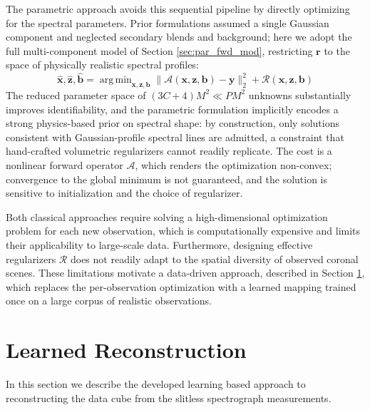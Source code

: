 \documentclass[linenumbers,twocolumn]{aastex7}
\DeclareMathOperator*{\argmin}{arg\,min}
\begin{document}
The parametric approach avoids this sequential pipeline by directly optimizing
for the spectral parameters. Prior formulations
\citep{oktem2014parametric, davila2019slitless} assumed a single Gaussian
component and neglected secondary blends and background; here we adopt the full
multi-component model of Section \ref{sec:par_fwd_mod}, restricting $\bm r$ to
the space of physically realistic spectral profiles:
\begin{equation}
\hat{\bm x}, \hat{\bm z}, \hat{\bm b} = \argmin_{\bm x, \bm z, \bm b}
\|\bm{\mathcal A}(\bm x, \bm z, \bm b) - \bm y\|_2^2 +
\mathcal R(\bm x, \bm z, \bm b)
\label{eq:rls_par}
\end{equation}
The reduced parameter space of $(3C+4)M^2 \ll PM^2$ unknowns substantially
improves identifiability, and the parametric formulation implicitly encodes a
strong physics-based prior on spectral shape: by construction, only solutions
consistent with Gaussian-profile spectral lines are admitted, a constraint that
hand-crafted volumetric regularizers cannot readily replicate. The cost is a
nonlinear forward operator $\bm{\mathcal A}$, which renders the optimization
non-convex; convergence to the global minimum is not guaranteed, and the
solution is sensitive to initialization and the choice of regularizer.

Both classical approaches require solving a high-dimensional optimization
problem for each new observation, which is computationally expensive and limits
their applicability to large-scale data. Furthermore, designing effective
regularizers $\mathcal R$ does not readily adapt to the spatial diversity of
observed coronal scenes. These limitations motivate a data-driven approach,
described in Section \ref{sec:learned_recon}, which replaces the per-observation
optimization with a learned mapping trained once on a large corpus of realistic
observations.

\section{Learned Reconstruction} \label{sec:learned_recon}
In this section we describe the developed learning based approach to
reconstructing the data cube from the slitless spectrograph measurements.
\end{document}

